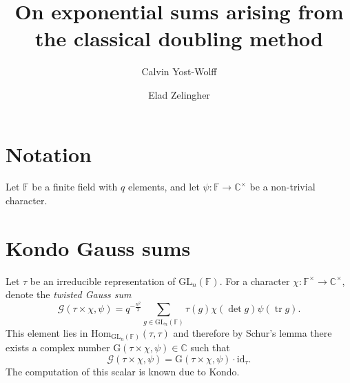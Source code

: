 \documentclass[12pt, reqno]{amsart}
\title{On exponential sums arising from the classical doubling method}
\author{Calvin Yost-Wolff}
\author{Elad Zelingher}
\theoremstyle{definition}
\theoremstyle{definition}
\theoremstyle{definition}
\newcommand{\cComplex}{\mathbb{C}}
\newcommand{\multiplicativegroup}[1]{#1^{\times}}
\newcommand{\Hom}{\mathrm{Hom}}
\newcommand{\idmap}{\mathrm{id}}
\newcommand{\fieldCharacter}{\psi}
\newcommand{\trace}{\operatorname{tr}}
\newcommand{\GL}{\mathrm{GL}}
\newcommand{\finiteField}{\mathbb{F}}
\newcommand{\GaussSum}[2]{\mathcal{G}\left(#1, #2\right)}
\newcommand{\GaussSumScalar}[2]{\mathrm{G}\left(#1, #2\right)}
\begin{document}
\begin{abstract}
\end{abstract}
\maketitle

\section{Notation}
Let $\finiteField$ be a finite field with $q$ elements, and let $\fieldCharacter \colon \finiteField \to \multiplicativegroup{\cComplex}$ be a non-trivial character. 

\section{Kondo Gauss sums}
Let $\tau$ be an irreducible representation of $\GL_n\left(\finiteField\right)$. 
For a character $\chi \colon \multiplicativegroup{\finiteField} \to \multiplicativegroup{\cComplex}$, denote the \emph{twisted Gauss sum}
$$\GaussSum{\tau \times \chi}{\fieldCharacter} = q^{-\frac{n^2}{2}} \sum_{g \in \GL_n\left(\finiteField\right)} \tau\left(g\right) \chi\left(\det g\right) \fieldCharacter\left(\trace g\right).$$
This element lies in $\Hom_{\GL_n\left(\finiteField\right)}\left(\tau, \tau\right)$ and therefore by Schur's lemma there exists a complex number $\GaussSumScalar{\tau \times \chi}{\fieldCharacter} \in \cComplex$ such that
$$\GaussSum{\tau \times \chi}{\fieldCharacter} = \GaussSumScalar{\tau \times \chi}{\fieldCharacter} \cdot \idmap_\tau.$$ The computation of this scalar is known due to Kondo.
\end{document}
